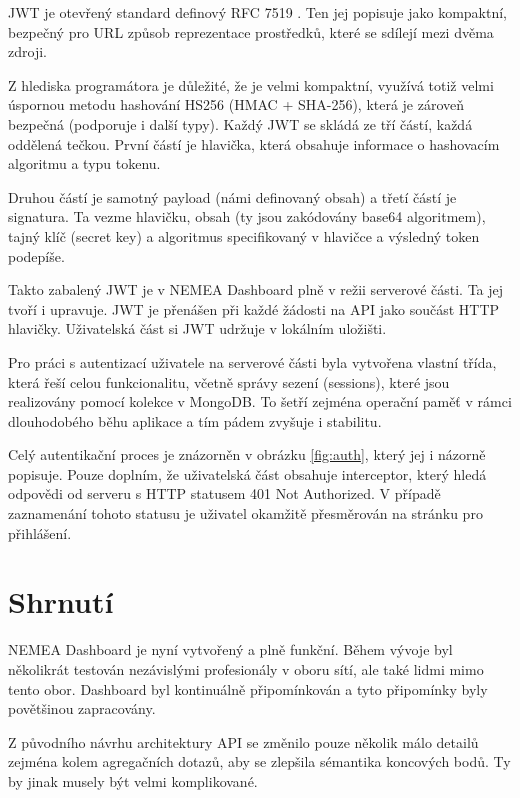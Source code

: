 JWT je otevřený standard definový RFC 7519 \cite{rfc:jwt}. Ten jej popisuje jako kompaktní, bezpečný pro URL způsob reprezentace prostředků, které se sdílejí mezi dvěma zdroji.

Z hlediska programátora je důležité, že je velmi kompaktní, využívá totiž velmi úspornou metodu hashování HS256 (HMAC + SHA-256), která je zároveň bezpečná (podporuje i další typy). Každý JWT se skládá ze tří částí, každá oddělená tečkou. První částí je hlavička, která obsahuje informace o hashovacím algoritmu a typu tokenu.

Druhou částí je samotný payload (námi definovaný obsah) a třetí částí je signatura. Ta vezme hlavičku, obsah (ty jsou zakódovány base64 algoritmem), tajný klíč (secret key) a algoritmus specifikovaný v hlavičce a výsledný token podepíše.

Takto zabalený JWT je v NEMEA Dashboard plně v režii serverové části. Ta jej tvoří i upravuje. JWT je přenášen při každé žádosti na API jako součást HTTP hlavičky. Uživatelská část si JWT udržuje v lokálním uložišti.

Pro práci s autentizací uživatele na serverové části byla vytvořena vlastní třída, která řeší celou funkcionalitu, včetně správy sezení (sessions), které jsou realizovány pomocí kolekce v MongoDB. To šetří zejména operační paměť v rámci dlouhodobého běhu aplikace a tím pádem zvyšuje i stabilitu.

Celý autentikační proces je znázorněn v obrázku \ref{fig:auth}, který jej i názorně popisuje. Pouze doplním, že uživatelská část obsahuje interceptor, který hledá odpovědi od serveru s HTTP statusem 401 Not Authorized. V případě zaznamenání tohoto statusu je uživatel okamžitě přesměrován na stránku pro přihlášení.



\section{Shrnutí}

NEMEA Dashboard je nyní vytvořený a plně funkční. Během vývoje byl několikrát testován nezávislými profesionály v oboru sítí, ale také lidmi mimo tento obor. Dashboard byl kontinuálně připomínkován a tyto připomínky byly povětšinou zapracovány.

Z původního návrhu architektury API se změnilo pouze několik málo detailů zejména kolem agregačních dotazů, aby se zlepšila sémantika koncových bodů. Ty by jinak musely být velmi komplikované.

